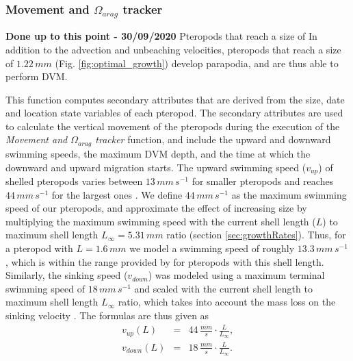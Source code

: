 \subsubsection{Movement and $\Omega_{arag}$ tracker}
\textbf{Done up to this point - 30/09/2020}
Pteropods that reach a size of 
In addition to the advection and unbeaching velocities, pteropods that reach a size of $1.22\,mm$ (Fig. \ref{fig:optimal_growth}) develop parapodia, and are thus able to perform DVM.




This function computes secondary attributes that are derived from the size, date and location state variables of each pteropod. The secondary attributes are used to calculate the vertical movement of the pteropods during the execution of the \textit{Movement and $\Omega_{arag}$ tracker} function, and include the upward and downward swimming speeds, the maximum DVM depth, and the time at which the downward and upward migration starts. 
The upward swimming speed ($v_{up}$) of shelled pteropods varies between $13 \, mm \, s^{-1}$ for smaller pteropods and reaches $44\, mm\, s^{-1}$ for the largest ones \citep{Chang2012SwimmingSpeedSize}. We define $44\, mm\, s^{-1}$ as the maximum swimming speed of our pteropods, and approximate the effect of increasing size by multiplying the maximum swimming speed with the current shell length ($L$) to maximum shell length $L_{\infty} = 5.31\, mm$ ratio (section \ref{sec:growthRates}).
Thus, for a pteropod with $L = 1.6\,mm$ we model a swimming speed of roughly $13.3 \, mm \, s^{-1}$, which is within the range provided by \cite{Murphy2016UpwardSwimming} for pteropods with this shell length. Similarly, the sinking speed ($v_{down}$) was modeled using a maximum terminal swimming speed of $18\, mm\, s^{-1}$ \citep{Bergan2017SwimmingSinkingSpeeds} and scaled with the current shell length to maximum shell length $L_{\infty}$ ratio, which takes into account the mass loss on the sinking velocity \citep{Byrne1984SettlingSpeed}. The formulas are thus given as
\begin{eqnarray}
v_{up}(L) & = & 44 \, \frac{mm}{s} \cdot \frac{L}{L_{\infty}},\\
v_{down}(L) & = & 18 \, \frac{mm}{s} \cdot \frac{L}{L_{\infty}}.
\end{eqnarray}


